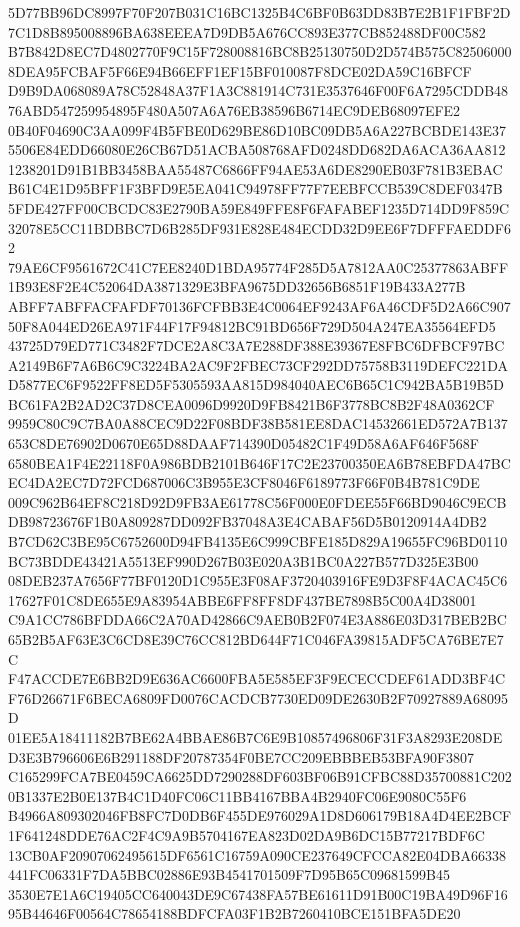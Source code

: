 \documentclass[UTF8,fontset=fandol,zihao=-4,a4paper]{ctexart}
\begin{document}
{{5D77BB96DC8997F70F207B031C16BC1325B4C6BF0B63DD83B7E2B1F1FBF2D7C1D8B895008896BA638EEEA7D9DB5A676CC893E377CB852488DF00C582
B7B842D8EC7D4802770F9C15F728008816BC8B25130750D2D574B575C825060008DEA95FCBAF5F66E94B66EFF1EF15BF010087F8DCE02DA59C16BFCF
D9B9DA068089A78C52848A37F1A3C881914C731E3537646F00F6A7295CDDB4876ABD547259954895F480A507A6A76EB38596B6714EC9DEB68097EFE2
0B40F04690C3AA099F4B5FBE0D629BE86D10BC09DB5A6A227BCBDE143E375506E84EDD66080E26CB67D51ACBA508768AFD0248DD682DA6ACA36AA812
1238201D91B1BB3458BAA55487C6866FF94AE53A6DE8290EB03F781B3EBACB61C4E1D95BFF1F3BFD9E5EA041C94978FF77F7EEBFCCB539C8DEF0347B
5FDE427FF00CBCDC83E2790BA59E849FFE8F6FAFABEF1235D714DD9F859C32078E5CC11BDBBC7D6B285DF931E828E484ECDD32D9EE6F7DFFFAEDDF62
79AE6CF9561672C41C7EE8240D1BDA95774F285D5A7812AA0C25377863ABFF1B93E8F2E4C52064DA3871329E3BFA9675DD32656B6851F19B433A277B
ABFF7ABFFACFAFDF70136FCFBB3E4C0064EF9243AF6A46CDF5D2A66C90750F8A044ED26EA971F44F17F94812BC91BD656F729D504A247EA35564EFD5
43725D79ED771C3482F7DCE2A8C3A7E288DF388E39367E8FBC6DFBCF97BCA2149B6F7A6B6C9C3224BA2AC9F2FBEC73CF292DD75758B3119DEFC221DA
D5877EC6F9522FF8ED5F5305593AA815D984040AEC6B65C1C942BA5B19B5DBC61FA2B2AD2C37D8CEA0096D9920D9FB8421B6F3778BC8B2F48A0362CF
9959C80C9C7BA0A88CEC9D22F08BDF38B581EE8DAC14532661ED572A7B137653C8DE76902D0670E65D88DAAF714390D05482C1F49D58A6AF646F568F
6580BEA1F4E22118F0A986BDB2101B646F17C2E23700350EA6B78EBFDA47BCEC4DA2EC7D72FCD687006C3B955E3CF8046F6189773F66F0B4B781C9DE
009C962B64EF8C218D92D9FB3AE61778C56F000E0FDEE55F66BD9046C9ECBDB98723676F1B0A809287DD092FB37048A3E4CABAF56D5B0120914A4DB2
B7CD62C3BE95C6752600D94FB4135E6C999CBFE185D829A19655FC96BD0110BC73BDDE43421A5513EF990D267B03E020A3B1BC0A227B577D325E3B00
08DEB237A7656F77BF0120D1C955E3F08AF3720403916FE9D3F8F4ACAC45C617627F01C8DE655E9A83954ABBE6FF8FF8DF437BE7898B5C00A4D38001
C9A1CC786BFDDA66C2A70AD42866C9AEB0B2F074E3A886E03D317BEB2BC65B2B5AF63E3C6CD8E39C76CC812BD644F71C046FA39815ADF5CA76BE7E7C
F47ACCDE7E6BB2D9E636AC6600FBA5E585EF3F9ECECCDEF61ADD3BF4CF76D26671F6BECA6809FD0076CACDCB7730ED09DE2630B2F70927889A68095D
01EE5A18411182B7BE62A4BBAE86B7C6E9B10857496806F31F3A8293E208DED3E3B796606E6B291188DF20787354F0BE7CC209EBBBEB53BFA90F3807
C165299FCA7BE0459CA6625DD7290288DF603BF06B91CFBC88D35700881C2020B1337E2B0E137B4C1D40FC06C11BB4167BBA4B2940FC06E9080C55F6
B4966A809302046FB8FC7D0DB6F455DE976029A1D8D606179B18A4D4EE2BCF1F641248DDE76AC2F4C9A9B5704167EA823D02DA9B6DC15B77217BDF6C
13CB0AF20907062495615DF6561C16759A090CE237649CFCCA82E04DBA66338441FC06331F7DA5BBC02886E93B4541701509F7D95B65C09681599B45
3530E7E1A6C19405CC640043DE9C67438FA57BE61611D91B00C19BA49D96F1695B44646F00564C78654188BDFCFA03F1B2B7260410BCE151BFA5DE20
}}
\end{document}
